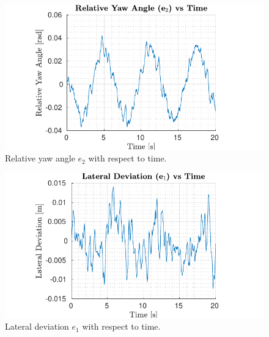 \documentclass[conference, 11pt]{IEEEtran}
\begin{document}
\begin{figure}[!h]
	\centering
	\includegraphics[width=1\columnwidth]{../../MATLAB/lane_following/figure/RelativeYawAngleVsTime.pdf}
	\caption{Relative yaw angle $e_2$ with respect to time.}
	\label{fig:relative_yaw_angle_laneFollowing}
\end{figure}
\begin{figure}[!h]
	\centering
	\includegraphics[width=1\columnwidth]{../../MATLAB/lane_following/figure/LateralDeviationVsTime.pdf}
	\caption{Lateral deviation $e_1$ with respect to time.}
	\label{fig:lateral_deviation_laneFollowing}
\end{figure}
\end{document}
